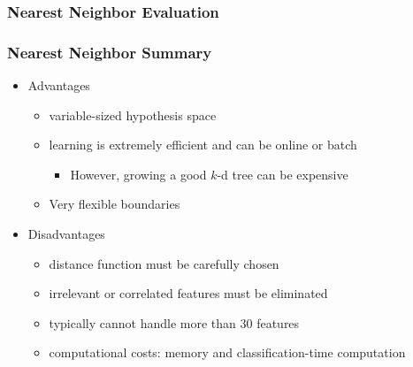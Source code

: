 \documentclass{beamer}
\newcommand*{\utb}{\item[{\texttt{[image: img/UTSymbols-Bullet.png]}}]}
\begin{document}
\begin{frame}
    \frametitle{Nearest Neighbor Evaluation}
\end{frame}

\begin{frame}
    \frametitle{Nearest Neighbor Summary}
    \begin{itemize}
        \utb Advantages
        \begin{itemize}
            \utb variable-sized hypothesis space
            \utb learning is extremely efficient and can be online or batch
            \begin{itemize}
                \utb However, growing a good $k$-d tree can be expensive
            \end{itemize}
            \utb Very flexible boundaries
        \end{itemize}
        \utb Disadvantages
        \begin{itemize}
            \utb distance function must be carefully chosen
            \utb irrelevant or correlated features must be eliminated
            \utb typically cannot handle more than 30 features
            \utb computational costs: memory and classification-time computation
        \end{itemize}
    \end{itemize}
\end{frame}
\end{document}
